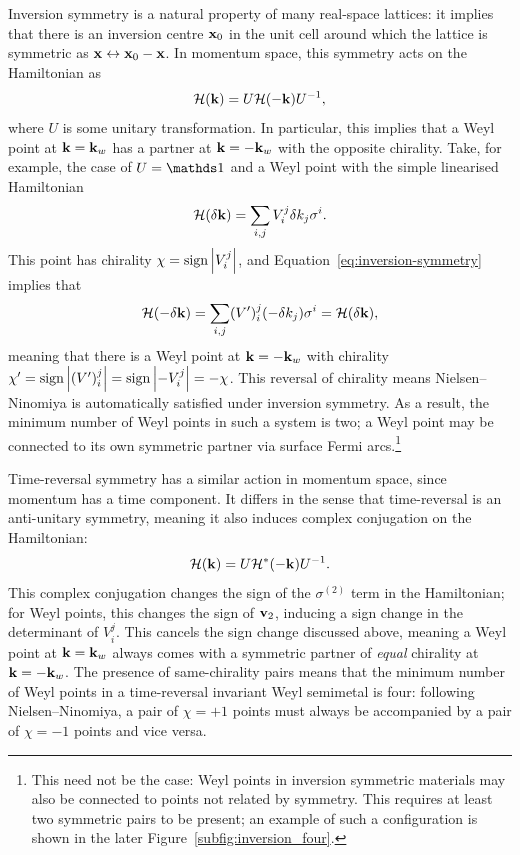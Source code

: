 Inversion symmetry is a natural property of many real-space lattices: it implies that there is an inversion centre $\vb{x}_0$ in the unit cell around which the lattice is symmetric as $\vb{x}\leftrightarrow\vb{x}_0-\vb{x}$. In momentum space, this symmetry acts on the Hamiltonian as
\begin{equation}\label{eq:inversion-symmetry}
	\mathcal{H}(\vb{k}) = U\mathcal{H}(-\vb{k})U^{-1},
\end{equation}
where $U$ is some unitary transformation. In particular, this implies that a Weyl point at $\vb{k}=\vb{k}_w$ has a partner at $\vb{k}=-\vb{k}_w$ with the opposite chirality. Take, for example, the case of $U=\Id$ and a Weyl point with the simple linearised Hamiltonian 
\begin{equation*}
	\mathcal{H}(\delta\vb{k}) = \sum_{i,j}V_i^j\delta k_j \sigma^i.
\end{equation*}
This point has chirality $\chi = \operatorname{sign}\abs{V_i^j}$, and Equation~\eqref{eq:inversion-symmetry} implies that
\begin{equation*}
	\mathcal{H}(-\delta\vb{k}) = \sum_{i,j}(V')_i^j(-\delta k_j)\sigma^i = \mathcal{H}(\delta\vb{k}),
\end{equation*}
meaning that there is a Weyl point at $\vb{k}=-\vb{k}_w$ with chirality $\chi' = \operatorname{sign}\abs{(V')_i^j} = \operatorname{sign}\abs{-V_i^j} = -\chi$. This reversal of chirality means Nielsen--Ninomiya is automatically satisfied under inversion symmetry. As a result, the minimum number of Weyl points in such a system is two; a Weyl point may be connected to its own symmetric partner via surface Fermi arcs.\footnote{
	This need not be the case: Weyl points in inversion symmetric materials may also be connected to points not related by symmetry. This requires at least two symmetric pairs to be present; an example of such a configuration is shown in the later Figure~\ref{subfig:inversion_four}.}

Time-reversal symmetry has a similar action in momentum space, since momentum has a time component. It differs in the sense that time-reversal is an anti-unitary symmetry, meaning it also induces complex conjugation on the Hamiltonian:
\begin{equation*}
	\mathcal{H}(\vb{k}) = U\mathcal{H}^*(-\vb{k})U^{-1}.
\end{equation*}
This complex conjugation changes the sign of the $\sigma^{(2)}$ term in the Hamiltonian; for Weyl points, this changes the sign of $\vb{v}_2$, inducing a sign change in the determinant of $V_i^j$. This cancels the sign change discussed above, meaning a Weyl point at $\vb{k}=\vb{k}_w$ always comes with a symmetric partner of \emph{equal} chirality at $\vb{k}=-\vb{k}_w$. The presence of same-chirality pairs means that the minimum number of Weyl points in a time-reversal invariant Weyl semimetal is four: following Nielsen--Ninomiya, a pair of $\chi = +1$ points must always be accompanied by a pair of $\chi=-1$ points and vice versa.

